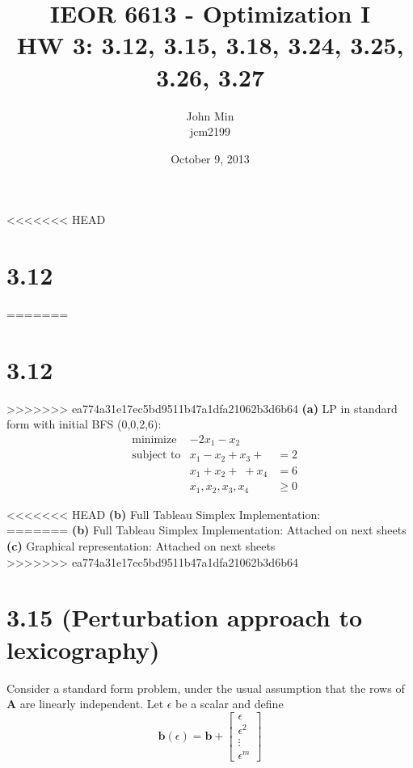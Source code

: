 \documentclass{article}
\begin{document}
\title{IEOR 6613 - Optimization I\\ HW 3:  3.12, 3.15, 3.18, 3.24, 3.25, 3.26, 3.27}

\author{John Min\\ jcm2199}
\date{October 9, 2013}
\maketitle
\pagebreak

<<<<<<< HEAD
\section{3.12}
=======
\section*{3.12}
>>>>>>> ea774a31e17ec5bd9511b47a1dfa21062b3d6b64
\textbf{(a)} LP in standard form with initial BFS (0,0,2,6):\\
\begin{equation*}
\begin{aligned}
& \text{minimize} & -2x_1 - x_2 &\\
& \text{subject to} &  x_1 - x_2 +x_3 + \; & = 2 \\
& 			&         x_1 + x_2 + \; + x_4 & = 6 \\
& 			&	x_1, x_2, x_3, x_4 & \geq 0
\end{aligned}
\end{equation*}

\noindent
<<<<<<< HEAD
\textbf{(b)} Full Tableau Simplex Implementation:\\

=======
\textbf{(b)} Full Tableau Simplex Implementation: Attached on next sheets\\
\textbf{(c)} Graphical representation: Attached on next sheets\\

\pagebreak
>>>>>>> ea774a31e17ec5bd9511b47a1dfa21062b3d6b64

\section*{3.15 (Perturbation approach to lexicography)}
Consider a standard form problem, under the usual assumption that the rows of \textbf{A} are linearly independent.  Let $\epsilon$ be a scalar and define 
\begin{equation*}
\mathbf{b}(\epsilon) = \mathbf{b} + 
     \begin{bmatrix}
      \epsilon \\
      \epsilon^2\\
       \vdots \\
       \epsilon^m 
	\end{bmatrix}
\end{equation*} \\
\end{document}
